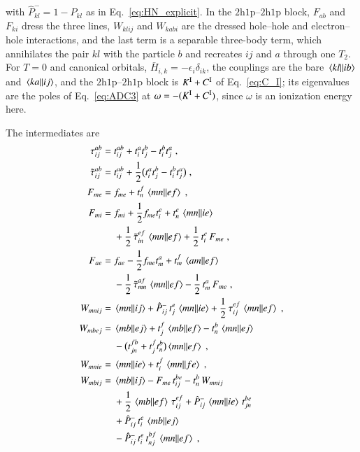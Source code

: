 \documentclass[aip,jcp,reprint,noshowkeys,superscriptaddress]{revtex4-1}
\newcommand{\eps}{\epsilon}
\newcommand{\hhp}{\text{2h1p}}
\begin{document}
with $\hat P^-_{kl}=1-\hat P_{kl}$ as in Eq.~\eqref{eq:HN_explicit}.
In the $\hhp$--$\hhp$ block, $F_{ab}$ and $F_{ki}$ dress the three lines,
$W_{klij}$ and $W_{kabi}$ are the dressed hole--hole and electron--hole
interactions, and the last term is a separable three-body term, which
annihilates the pair $kl$ with the particle $b$ and recreates $ij$ and $a$
through one $T_2$. For $T=0$ and canonical orbitals, $\bar H_{i,k}=-\eps_i\delta_{ik}$,
the couplings are the bare $\mel{kl}{}{ib}$ and $\mel{ka}{}{ij}$, and the
$\hhp$--$\hhp$ block is $K^{\rm I}+C^{\rm I}$ of Eq.~\eqref{eq:C_I};
its eigenvalues are the poles of Eq.~\eqref{eq:ADC3} at
$\omega=-(K^{\rm I}+C^{\rm I})$, since $\omega$ is an ionization energy
here.

The intermediates are
\begin{align}
\tau_{ij}^{ab}={}&t_{ij}^{ab}+t_i^a t_j^b-t_i^b t_j^a \;,
\nonumber\\
\tilde\tau_{ij}^{ab}={}&t_{ij}^{ab}+\frac12\big(t_i^a t_j^b-t_i^b t_j^a\big) \;,
\nonumber\\
F_{me}={}&f_{me}+t_n^f\,\mel{mn}{}{ef} \;,
\nonumber\\
F_{mi}={}&f_{mi}+\frac12 f_{me}t_i^e+t_n^e\,\mel{mn}{}{ie}
\nonumber\\
&+\frac12\,\tilde\tau_{in}^{ef}\,\mel{mn}{}{ef}
+\frac12\,t_i^e\,F_{me} \;,
\nonumber\\
F_{ae}={}&f_{ae}-\frac12 f_{me}t_m^a+t_m^f\,\mel{am}{}{ef}
\nonumber\\
&-\frac12\,\tilde\tau_{mn}^{af}\,\mel{mn}{}{ef}
-\frac12\,t_m^a\,F_{me} \;,
\nonumber\\
W_{mnij}={}&\mel{mn}{}{ij}+\hat P^-_{ij}\,t_j^e\,\mel{mn}{}{ie}
+\frac12\,\tau_{ij}^{ef}\,\mel{mn}{}{ef} \;,
\nonumber\\
W_{mbej}={}&\mel{mb}{}{ej}+t_j^f\,\mel{mb}{}{ef}-t_n^b\,\mel{mn}{}{ej}
\nonumber\\
&-\big(t_{jn}^{fb}+t_j^f t_n^b\big)\mel{mn}{}{ef} \;,
\nonumber\\
W_{mnie}={}&\mel{mn}{}{ie}+t_i^f\,\mel{mn}{}{fe} \;,
\nonumber\\
W_{mbij}={}&\mel{mb}{}{ij}-F_{me}\,t_{ij}^{be}-t_n^b\,W_{mnij}
\nonumber\\
&+\frac12\,\mel{mb}{}{ef}\,\tau_{ij}^{ef}
+\hat P^-_{ij}\,\mel{mn}{}{ie}\,t_{jn}^{be}
\nonumber\\
&+\hat P^-_{ij}\,t_i^e\,\mel{mb}{}{ej}
\nonumber\\
&-\hat P^-_{ij}\,t_i^e\,t_{nj}^{bf}\,\mel{mn}{}{ef} \;,
\label{eq:eom_intermediates}
\end{align}
\end{document}
